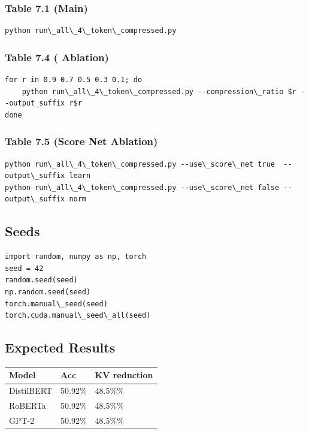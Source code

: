 \subsubsection{Table 7.1 (Main)}
\begin{lstlisting}
python run\_all\_4\_token\_compressed.py
\end{lstlisting}

\subsubsection{Table 7.4 (  Ablation)}
\begin{lstlisting}
for r in 0.9 0.7 0.5 0.3 0.1; do
    python run\_all\_4\_token\_compressed.py --compression\_ratio $r --output_suffix r$r
done
\end{lstlisting}

\subsubsection{Table 7.5 (Score Net Ablation)}
\begin{lstlisting}
python run\_all\_4\_token\_compressed.py --use\_score\_net true  --output\_suffix learn
python run\_all\_4\_token\_compressed.py --use\_score\_net false --output\_suffix norm
\end{lstlisting}

\subsection{Seeds}

\begin{lstlisting}
import random, numpy as np, torch
seed = 42
random.seed(seed)
np.random.seed(seed)
torch.manual\_seed(seed)
torch.cuda.manual\_seed\_all(seed)
\end{lstlisting}

\subsection{Expected Results}

\begin{table}[H]
\centering
\small
\begin{tabular}{lll}
\toprule
\textbf{Model} & \textbf{Acc} & \textbf{KV reduction} \\
\midrule
DistilBERT & 50.92\% & 48.5\%\% \\
RoBERTa & 50.92\% & 48.5\%\% \\
GPT-2 & 50.92\% & 48.5\%\% \\
\bottomrule
\end{tabular}
\end{table}

